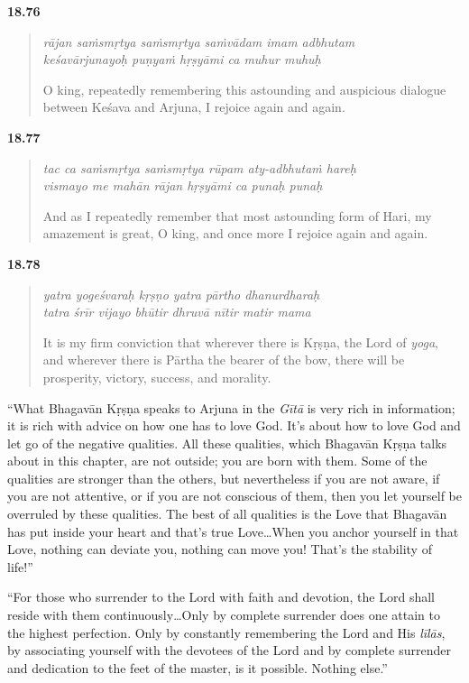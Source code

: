 \par\noindent\textbf{18.76}\par
\begin{verse}
\textit{rājan saṁsmṛtya saṁsmṛtya saṁvādam imam adbhutam} \\
\textit{keśavārjunayoḥ puṇyaṁ hṛṣyāmi ca muhur muhuḥ}

\noindent O king, repeatedly remembering this astounding and auspicious dialogue between Keśava and Arjuna, I rejoice again and again.
\end{verse}
\par



\par\noindent\textbf{18.77}\par
\begin{verse}
\textit{tac ca saṁsmṛtya saṁsmṛtya rūpam aty-adbhutaṁ hareḥ} \\
\textit{vismayo me mahān rājan hṛṣyāmi ca punaḥ punaḥ}

\noindent And as I repeatedly remember that most astounding form of Hari, my amazement is great, O king, and once more I rejoice again and again.
\end{verse}
\par



\par\noindent\textbf{18.78}\par
\begin{verse}
\textit{yatra yogeśvaraḥ kṛṣṇo yatra pārtho dhanurdharaḥ} \\
\textit{tatra śrīr vijayo bhūtir dhruvā nītir matir mama}

\noindent It is my firm conviction that wherever there is Kṛṣṇa, the Lord of \textit{yoga}, and wherever there is Pārtha the bearer of the bow, there will be prosperity, victory, success, and morality.
\end{verse}
\par


\enquote{What Bhagavān Kṛṣṇa speaks to Arjuna in the \textit{Gītā} is very rich in information; it is rich with advice on how one has to love God. It’s about how to love God and let go of the negative qualities. All these qualities, which Bhagavān Kṛṣṇa talks about in this chapter, are not outside; you are born with them. Some of the qualities are stronger than the others, but nevertheless if you are not aware, if you are not attentive, or if you are not conscious of them, then you let yourself be overruled by these qualities. The best of all qualities is the Love that Bhagavān has put inside your heart and that’s true Love\ldots When you anchor yourself in that Love, nothing can deviate you, nothing can move you! That’s the stability of life!}

\enquote{For those who surrender to the Lord with faith and devotion, the Lord shall reside with them continuously\ldots Only by complete surrender does one attain to the highest perfection. Only by constantly remembering the Lord and His \textit{līlās}, by associating yourself with the devotees of the Lord and by complete surrender and dedication to the feet of the master, is it possible. Nothing else.}
